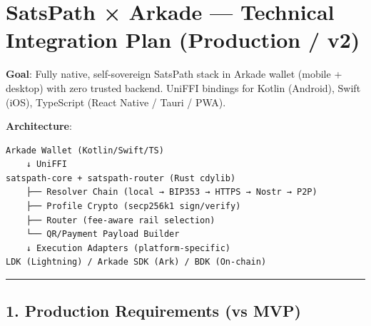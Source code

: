 \documentclass[
]{article}
\author{}
\date{}
\begin{document}
\hypertarget{satspath-arkade-technical-integration-plan-production-v2}{%
\section{SatsPath × Arkade --- Technical Integration Plan (Production /
v2)}\label{satspath-arkade-technical-integration-plan-production-v2}}

\textbf{Goal}: Fully native, self-sovereign SatsPath stack in Arkade
wallet (mobile + desktop) with zero trusted backend. UniFFI bindings for
Kotlin (Android), Swift (iOS), TypeScript (React Native / Tauri / PWA).

\textbf{Architecture}:

\begin{verbatim}
Arkade Wallet (Kotlin/Swift/TS)
    ↓ UniFFI
satspath-core + satspath-router (Rust cdylib)
    ├── Resolver Chain (local → BIP353 → HTTPS → Nostr → P2P)
    ├── Profile Crypto (secp256k1 sign/verify)
    ├── Router (fee-aware rail selection)
    └── QR/Payment Payload Builder
    ↓ Execution Adapters (platform-specific)
LDK (Lightning) / Arkade SDK (Ark) / BDK (On-chain)
\end{verbatim}

\begin{center}\rule{0.5\linewidth}{0.5pt}\end{center}

\hypertarget{production-requirements-vs-mvp}{%
\subsection{1. Production Requirements (vs
MVP)}\label{production-requirements-vs-mvp}}
\end{document}
